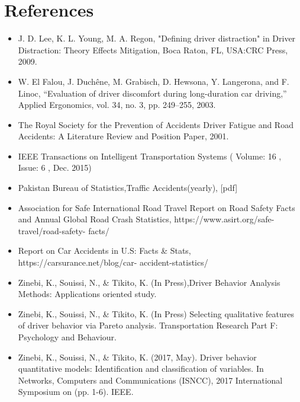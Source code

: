 \chapter{References}
\begin{itemize}
    \item J. D. Lee, K. L. Young, M. A. Regon, "Defining driver distraction" in Driver
Distraction: Theory Effects Mitigation, Boca Raton, FL, USA:CRC Press, 2009.
\item W. El Falou, J. Duchêne, M. Grabisch, D. Hewsona, Y. Langerona, and F. Linoc,
“Evaluation of driver discomfort during long-duration car driving,” Applied
Ergonomics, vol. 34, no. 3, pp. 249–255, 2003.
\item The Royal Society for the Prevention of Accidents Driver Fatigue and Road
Accidents: A Literature Review and Position Paper, 2001.
\item IEEE Transactions on Intelligent Transportation Systems ( Volume: 16 , Issue: 6 ,
Dec. 2015)
\item Pakistan Bureau of Statistics,Traffic Accidents(yearly), [pdf]
\item Association for Safe International Road Travel Report on Road Safety Facts and
Annual Global Road Crash Statistics, https://www.asirt.org/safe-travel/road-safety-
facts/
\item Report on Car Accidents in U.S: Facts \& Stats, https://carsurance.net/blog/car-
accident-statistics/
\item Zinebi, K., Souissi, N., \& Tikito, K. (In Press),Driver Behavior Analysis Methods:
Applications oriented study.
\item Zinebi, K., Souissi, N., \& Tikito, K. (In Press) Selecting qualitative features of driver
behavior via Pareto analysis. Transportation Research Part F: Psychology and
Behaviour.
\item Zinebi, K., Souissi, N., \& Tikito, K. (2017, May). Driver behavior quantitative models:
Identification and classification of variables. In Networks, Computers and
Communications (ISNCC), 2017 International Symposium on (pp. 1-6). IEEE.
\end{itemize}





